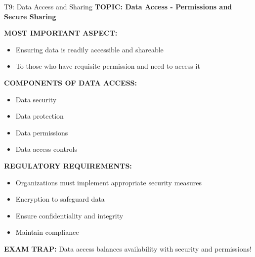 \documentclass[8pt]{beamer}
\begin{document}
	\begin{frame}{T9: Data Access and Sharing}
		\fontsize{6.5}{7.5}\selectfont
		\textbf{TOPIC: Data Access - Permissions and Secure Sharing}
		
		\vspace{0.1cm}
		\textbf{MOST IMPORTANT ASPECT:}
		\begin{itemize}
			\item Ensuring data is readily accessible and shareable
			\item To those who have requisite permission and need to access it
		\end{itemize}
		
		\vspace{0.1cm}
		\textbf{COMPONENTS OF DATA ACCESS:}
		\begin{itemize}
			\item Data security
			\item Data protection
			\item Data permissions
			\item Data access controls
		\end{itemize}
		
		\vspace{0.1cm}
		\textbf{REGULATORY REQUIREMENTS:}
		\begin{itemize}
			\item Organizations must implement appropriate security measures
			\item Encryption to safeguard data
			\item Ensure confidentiality and integrity
			\item Maintain compliance
		\end{itemize}
		
		\textcolor{myred}{\textbf{EXAM TRAP:}} Data access balances \textcolor{myblue}{availability with security and permissions}!
	\end{frame}
	
\end{document}
